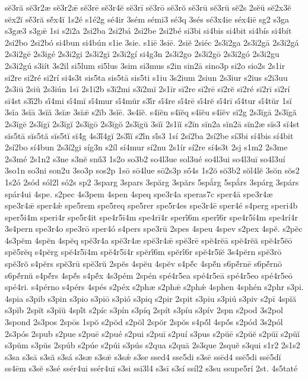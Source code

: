 {sĕ3ră
sĕ3r2æ
sĕ3r2ǣ
sĕ3rē
sĕ3r4ĕ
sĕ3rī
sĕ3rō
sĕ3rŏ
sĕ3rū
sĕ3rŭ
sĕ2s
2sĕŭ
sĕ2x3ĕ
sĕx2ĭ
sĕ́3ră
sĕ́x4ĭ
1s2é
s1é2g
sé4ir
3sém
sémi3
sé3q
3sés
sé3x4ie
séx4iē
sg2
s3ga
s3gæ3
s3gǣ
1si
s2i2a
2si2ba
2si2bá
2si2be
2si2bé
si3bi
si4bis
si4bit
si4bís
si4bít
2si2bo
2si2bó
si4bun
si4bún
s1ie
3sie.
s1iē
3siē.
2siĕ
2siéc
2s3i2ga
2s3i2gā
2s3i2gá
2s3i2gē
2s3igé
2s3i2gi
2s3i2gī
2s3i2gí
si4g3n
2s3i2go
2s3i2gō
2s3i2gó
2s3i2gu
2s3i2gú
s3iít
3s2il
si5lum
si5lus
3sim
si3mus
s2in
sin2ā
sino3p
si2o
sio2s
2s1ir
si2re
si2ré
si2rí
si4s3t
sis5ta
sis5tā
sis5ti
s1iu
3s2ium
2siun
2s3iur
s2ius
s2i3uu
2s3iū
2siŭ
2s3iún
1sī
2s1ī2b
s3ī2mi
s3ī2mĭ
2s1īr
sī2re
sī2rē
sī2rĕ
sī2ré
sī2rī
sī2rí
sī4st
s3ī́2b
sī́4mi
sī́4mĭ
sī́4mur
sī́4mŭr
s3ī́r
sī́4re
sī́4rē
sī́4rĕ
sī́4rī
sī́4tur
sī́4tŭr
1sĭ
3sĭa
3sĭā
3sĭă
3sĭæ
3sĭǣ
s2ĭb
3sĭē.
3s4ĭĕ.
s4ĭĕn
s4ĭĕq
s4ĭĕu
s4ĭĕv
sĭ2g
2s3ĭgā
2s3ĭgă
2s3ĭgē
2s3ĭgī
2s3ĭgĭ
2s3ĭgō
2s3ĭgŏ
2s3ĭgŭ
3sĭī
2s1ĭĭ
s2ĭn
sĭn2a
sĭn2ā
sĭn2æ
sĭs3
sĭ4st
sĭs5tā
sĭs5tă
sĭs5tĭ
sĭ4́g
4s3ĭ́4gĭ
2s3ĭ́ĭ
s2ĭ́n
sĭ́s3
1sí
2sí2ba
2sí2be
sí3bi
sí4bis
sí4bit
2sí2bo
sí4bun
2s3í2gi
síg3n
s2íl
sí4mur
sí2nu
2s1ír
sí2re
sí4s3t
2sj
s1m2
2s3me
2s3mé
2s1n2
s3ne
s3nĕ
snŭ́3
1s2o
so3b2
so4l3ue
sol3ué
so4l3ui
so4l3uī
so4l3uí
3so1n
so3ni
son2u
3so3p
sos2p
1sō
sō4lue
sō2s3p
sṓ4s
1s2ŏ
sŏ3b2
sŏl4lĕ
3sŏn
sŏs2
1s2ó
2sód
sól2l
só2s
sp2
3sparg
3spars
3spărg
3spărs
5spắrg
5spắrs
3spárg
3spárs
spár4ui
4spe.
s2pec
4s3pem
4spen
4speq
spe3r4a
speras7c
sper4ā
spe3r4æ
spe3r4ǣ
sper4ǽ
spe5rem
spe5req
spe5rer
spe5r4es
spe3r4ē
sper4é
s4perg
speri4b
sper5i4m
speri4r
spe5r4it
spe4r5ī4m
spe4rī4r
sperī́6m
sperī́6r
spe4r5í4m
spe4rí4r
3s4pern
spe3r4o
spe3rō
sper4ó
s4pers
spe3rū
2spes
4speu
4spev
s2pex
4spĕ.
s2pĕc
4s3pĕm
4spĕn
4spĕq
spĕ3r4a
spĕ3r4æ
spĕ3r4ǣ
spĕ3rē
spĕ4rĕā
spĕ4rĕă
spĕ4r5ĕō
spĕ5rĕq
s4pĕrg
spĕ4r5ī4m
spĕ4r5ī4r
spĕrī́6m
spĕrī́6r
spĕ4r5ĭĕ
3s4pĕrn
spĕ3rō
spĕ3rŏ
s4pĕrs
spĕ3rū
spĕ3rŭ
2spĕs
4spĕu
4spĕv
s4pĕ́c
4spĕ́n
s6pĕ́rnē
s6pĕ́rnō
s6pĕ́rnŭ
s4pĕ́rs
4spĕ́s
s4pĕ́x
4s3pém
2spén
spé4r5ea
spé4r5eā
spé4r5eo
spé4r5eō
spé4ri.
s4pérno
s4pérs
4spés
s2péx
s2phæ
s2phǣ
s2phǽ
4sphen
4sphén
s2phr
s3pi.
4spia
s3pib
s3pin
s3pio
s3piō
s3pió
s3piq
s2pir
2spit
s3piu
s3piú
s3piv
s2pī
4spĭă
s3pĭb
2spĭt
s3pĭŭ
4spĭ́t
s2píc
s3pín
s3píq
2spít
s3píu
s3pív
2spn
s2pod
3s2pol
3spond
2s3pos
2spōs
1spŏ
s2pŏd
s2pŏl
2spŏr
2spŏs
s4pŏ́l
4spŏ́s
s2pód
3s2pól
2s3pós
2spub
s2pue
s2puē
s2pué
s2pui
s2puī
s2puí
s3pus
s2pŭē
s2pŭĕ
s2pŭī
s2pŭĭ
s3pŭm
s3pŭs
2spúb
s2púe
s2púi
s3pús
s2qua
s2quā
2s3que
2squĕ
s3qui
s1r2
2s1s2
s3sa
s3sā
s3să
s3sá
s3sæ
s3sǣ
s3sǽ
s3se
ssed4
sse5di
s3sē
ssēd4
ssē5di
ssē5dĭ
ss4ēm
s3sĕ
s3sé
ssér4ui
ssér4uī
s3si
ssi3l4
s3sī
s3sí
ssíl2
s3su
ssupe5rí
2st.
4s5taté
}
